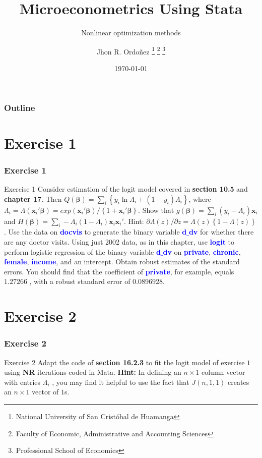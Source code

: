 \documentclass[11pt, aspectratio=169]{beamer}
\title{Microeconometrics Using Stata}
\subtitle{Nonlinear optimization methods}
\author{
		Jhon R. Ordoñez
		\footnote{\label{1} National University of San Cristóbal de Huamanga}
		\footnote{\label{2} Faculty of Economic, Administrative and Accounting Sciences}
		\footnote{\label{3} Professional School of Economics}
	}
\date{\today}
\begin{document}
	\begin{frame}
		\maketitle
	\end{frame}
	\begin{frame}[t]
		\frametitle{Outline}
		\tableofcontents
	\end{frame}
	\section{Exercise 1}
		\begin{frame}
			\frametitle{Exercise 1}
				\begin{block}{Exercise 1}
					Consider estimation of the logit model covered in \textcolor{red!50}{\textbf{section 10.5}} and
					\textcolor{red!50}{\textbf{chapter 17}}. Then $Q(\mathbf{\beta}) = \sum_{i}\left\{y_{i} \ln{\Lambda_{i}} + \left(1 - y_{i}\right)\Lambda_{i}\right\}$, where
					$\Lambda_{i} = \Lambda\left(\mathbf{x}_{i}'\mathbf{\beta}\right) = exp\left(\mathbf{x}_{i}'\mathbf{\beta}\right)/ \left\{1 + \mathbf{x}_{i}'\mathbf{\beta}\right\}$. 
					Show that $g\left(\mathbf{\beta}\right) = \sum_{i}\left(y_{i} - \Lambda_{i}\right)\mathbf{x}_{i}$
					and $H\left(\mathbf{\beta}\right) = \sum_{i} - \Lambda_{i}\left(1 - \Lambda_{i}\right)\mathbf{x}_{i}\mathbf{x}_{i}'$. 
					\textcolor{magenta!87}{Hint: \textbf{$\partial \Lambda \left(z\right) / \partial z = \Lambda\left(z\right)\left\{1 - \Lambda\left(z\right)\right\}$}}.
					Use the data on \textcolor{blue}{\textbf{docvis}} to generate the binary variable \textcolor{blue}{\textbf{d$\_$dv}} for whether there are
					any doctor visits. Using just 2002 data, as in this chapter, use \textcolor{blue}{\textbf{logit}} to
					perform logistic regression of the binary variable \textcolor{blue}{\textbf{d$\_$dv}} on \textcolor{blue}{\textbf{private}}, \textcolor{blue}{\textbf{chronic}},
					\textcolor{blue}{\textbf{female}}, \textcolor{blue}{\textbf{income}}, and an intercept. Obtain robust estimates of the standard
					errors. You should find that the coefficient of \textcolor{blue}{\textbf{private}}, for example, equals $1.27266$
					, with a robust standard error of $0.0896928$.
				\end{block}
		\end{frame}
	\section{Exercise 2}
		\begin{frame}
			\frametitle{Exercise 2}
			\begin{block}{Exercise 2}
				Adapt the code of \textcolor{red!50}{\textbf{section 16.2.3}} to fit the logit model
				of exercise $1$ using \textbf{NR} iterations coded in Mata. 
				\textcolor{magenta!87}{\textbf{Hint:} In defining an $n\times 1$ column vector with entries $\Lambda_{i}$ , you may find it helpful
				to use the fact that $J(n,1,1)$ creates an $n \times 1$ vector of $1$s}.
			\end{block}
		\end{frame}
\end{document}

